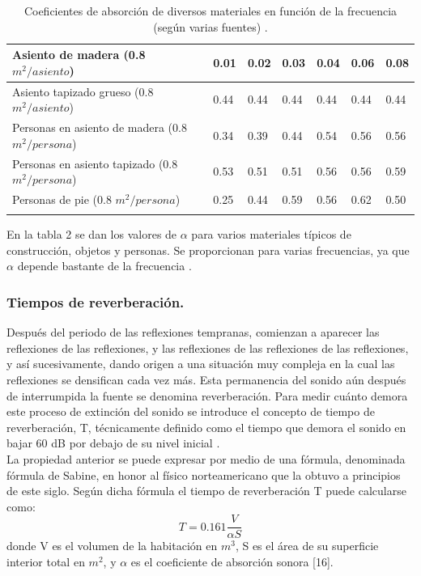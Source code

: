 \begin{center}
\begin{longtable}[!htb]{| m{22em} | m{2.5em} | m{2.5em} | m{2.5em} | m{2.5em} | m{2.5em} |m{2.5em} |}
    \hline
    Asiento de madera (0.8 $m^2/asiento$) & 0.01 & 0.02 & 0.03 & 0.04 & 0.06 & 0.08\\
    \hline
    Asiento tapizado grueso (0.8 $m^2/asiento$) & 0.44 & 0.44 & 0.44 & 0.44 & 0.44 & 0.44\\
    \hline
    Personas en asiento de madera (0.8 $m^2/persona$) & 0.34 & 0.39 & 0.44 & 0.54 & 0.56 & 0.56\\
    \hline
    Personas en asiento tapizado (0.8 $m^2/persona$) & 0.53 & 0.51 & 0.51 & 0.56 & 0.56 & 0.59\\
    \hline
    Personas de pie (0.8 $m^2/persona$) & 0.25 & 0.44 & 0.59 & 0.56 & 0.62 & 0.50\\
    \hline
    \caption{Coeficientes de absorción de diversos materiales en función de la frecuencia (según varias fuentes) \cite{Miyara2004}.}
    \label{tab:CoefMateriales}
    \end{longtable}
\end{center}

En la tabla 2 se dan los valores de $\alpha$ para varios materiales típicos de construcción, objetos y personas. Se proporcionan para varias frecuencias, ya que $\alpha$ depende bastante de la frecuencia \cite{Miyara2004}.

\subsubsection{Tiempos de reverberación.} Después del periodo de las reflexiones tempranas, comienzan a aparecer las reflexiones de las reflexiones, y las reflexiones de las reflexiones de las reflexiones, y así sucesivamente, dando origen a una situación muy compleja en la cual las reflexiones se densifican cada vez más. Esta permanencia del sonido aún después de interrumpida la fuente se denomina reverberación. Para medir cuánto demora este proceso de extinción del sonido se introduce el concepto de tiempo de reverberación, T, técnicamente definido como el tiempo que demora el sonido en bajar 60 dB por debajo de su nivel inicial \cite{Miyara2004}.
\\
La propiedad anterior se puede expresar por medio de una fórmula, denominada fórmula de Sabine, en honor al físico norteamericano que la obtuvo a principios de este siglo. Según dicha fórmula el tiempo de reverberación T puede calcularse como:
\begin{equation}
T = 0.161\frac{V}{\alpha S}
\end{equation}
donde V es el volumen de la habitación en $m^3$, S es el área de su superficie interior total en $m^2$, y $\alpha$ es el coeficiente de absorción sonora [16].

